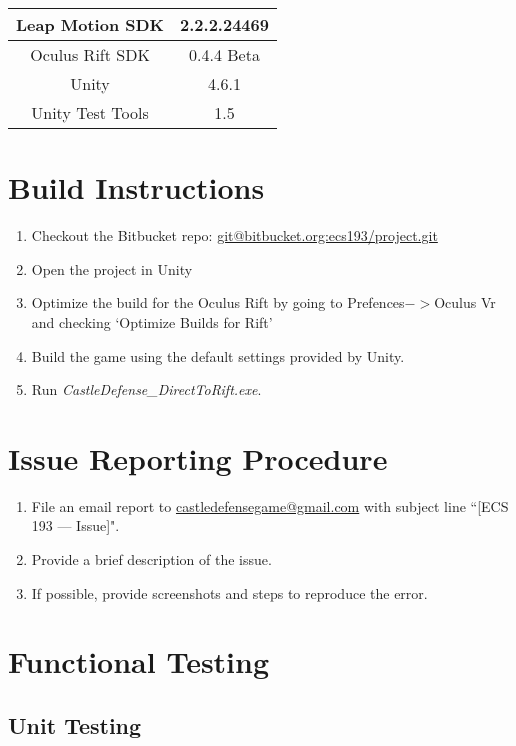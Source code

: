 \begin{table}[h]
	\renewcommand*{\arraystretch}{1.5}
	\centering
	\begin{tabular}{| c | c |}
		\hline
		Leap Motion SDK		&	2.2.2.24469\\
		\hline
		Oculus Rift SDK		&	0.4.4 Beta\\
		\hline
		Unity				&	4.6.1\\
		\hline
		Unity Test Tools	&	1.5\\
		\hline
	\end{tabular}
\end{table}


\section{Build Instructions}

\begin{enumerate}
	\item Checkout the Bitbucket repo: \url{git@bitbucket.org:ecs193/project.git}
	\item Open the project in Unity
	\item Optimize the build for the Oculus Rift by going to Prefences$->$Oculus Vr and checking `Optimize Builds for Rift'
	\item Build the game using the default settings provided by Unity. 
	\item Run \textit{CastleDefense\_DirectToRift.exe}.
\end{enumerate}

\section{Issue Reporting Procedure}

\begin{enumerate}
	\item File an email report to \url{castledefensegame@gmail.com} with subject line ``[ECS 193 --- Issue]".
	\item Provide a brief description of the issue.
	\item If possible, provide screenshots and steps to reproduce the error.
\end{enumerate}

\section{Functional Testing}

\subsection{Unit Testing}

